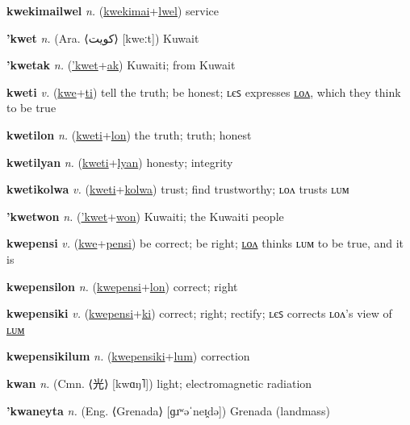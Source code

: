 \textbf{\hypertarget{kwekimailwel}{kwekimailwel}} \textit{n.} (\hyperlink{kwekimai}{kwekimai}+\allowbreak \hyperlink{lwel}{lwel})
service

\textbf{\hypertarget{'kwet}{'kwet}} \textit{n.} (Ara. ⟨{\arabics{}كويت}⟩ [kweːt])
Kuwait

\textbf{\hypertarget{'kwetak}{'kwetak}} \textit{n.} (\hyperlink{'kwet}{'kwet}+\allowbreak \hyperlink{ak}{ak})
Kuwaiti; from Kuwait

\textbf{\hypertarget{kweti}{kweti}} \textit{v.} (\hyperlink{kwe}{kwe}+\allowbreak \hyperlink{ti}{ti})
tell the truth; be honest; ʟєꜱ expresses \hyperlink{kwetilon}{ʟᴏᴧ}, which they think to be true

\textbf{\hypertarget{kwetilon}{kwetilon}} \textit{n.} (\hyperlink{kweti}{kweti}+\allowbreak \hyperlink{lon}{lon})
the truth; truth; honest

\textbf{\hypertarget{kwetilyan}{kwetilyan}} \textit{n.} (\hyperlink{kweti}{kweti}+\allowbreak \hyperlink{lyan}{lyan})
honesty; integrity

\textbf{\hypertarget{kwetikolwa}{kwetikolwa}} \textit{v.} (\hyperlink{kweti}{kweti}+\allowbreak \hyperlink{kolwa}{kolwa})
trust; find trustworthy; ʟᴏᴧ trusts ʟᴜᴍ

\textbf{\hypertarget{'kwetwon}{'kwetwon}} \textit{n.} (\hyperlink{'kwet}{'kwet}+\allowbreak \hyperlink{won}{won})
Kuwaiti; the Kuwaiti people

\textbf{\hypertarget{kwepensi}{kwepensi}} \textit{v.} (\hyperlink{kwe}{kwe}+\allowbreak \hyperlink{pensi}{pensi})
be correct; be right; \hyperlink{kwepensilon}{ʟᴏᴧ} thinks ʟᴜᴍ to be true, and it is

\textbf{\hypertarget{kwepensilon}{kwepensilon}} \textit{n.} (\hyperlink{kwepensi}{kwepensi}+\allowbreak \hyperlink{lon}{lon})
correct; right

\textbf{\hypertarget{kwepensiki}{kwepensiki}} \textit{v.} (\hyperlink{kwepensi}{kwepensi}+\allowbreak \hyperlink{ki}{ki})
correct; right; rectify; ʟєꜱ corrects ʟᴏᴧ’s view of \hyperlink{kwepensikilum}{ʟᴜᴍ}

\textbf{\hypertarget{kwepensikilum}{kwepensikilum}} \textit{n.} (\hyperlink{kwepensiki}{kwepensiki}+\allowbreak \hyperlink{lum}{lum})
correction

\textbf{\hypertarget{kwan}{kwan}} \textit{n.} (Cmn. ⟨{\chinese{}光}⟩ [kwɑŋ˥])
light; electromagnetic radiation

\textbf{\hypertarget{'kwaneyta}{'kwaneyta}} \textit{n.} (Eng. ⟨Grenada⟩ [ɡɹʷəˈneɪ̯də])
Grenada (landmass)

